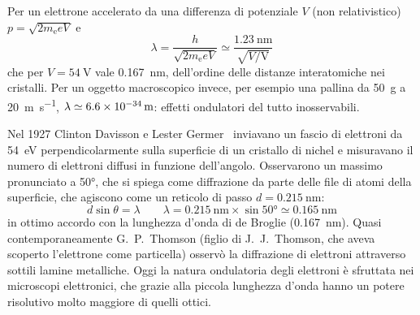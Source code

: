 Per un elettrone accelerato da una differenza di potenziale $V$ (non relativistico) $p=\sqrt{2m_\mathrm{e}eV}$ e
\[
  \lambda=\frac{h}{\sqrt{2m_\mathrm{e}eV}}\simeq\frac{\SI{1.23}{\nano\meter}}{\sqrt{V/\si{\volt}}}
\]
che per $V=\SI{54}{\volt}$ vale \SI{0.167}{\nano\meter}, dell'ordine delle distanze interatomiche nei cristalli. Per un oggetto macroscopico invece, per esempio una pallina da \SI{50}{\gram} a \SI{20}{\meter\per\second}, $\lambda\simeq\SI{6.6E-34}{\meter}$: effetti ondulatori del tutto inosservabili.
\begin{Es}
  Nel 1927 Clinton Davisson e Lester Germer~\cite{davisson1927} inviavano un fascio di elettroni da \SI{54}{\electronvolt} perpendicolarmente sulla superficie di un cristallo di nichel e misuravano il numero di elettroni diffusi in funzione dell'angolo. Osservarono un massimo pronunciato a \ang{50}, che si spiega come diffrazione da parte delle file di atomi della superficie, che agiscono come un reticolo di passo $d=\SI{0.215}{\nano\meter}$:
  \[
    d\sin\theta=\lambda\qquad\lambda=\SI{0.215}{\nano\meter}\times\sin\ang{50}\simeq\SI{0.165}{\nano\meter}
  \]
  in ottimo accordo con la lunghezza d'onda di de Broglie (\SI{0.167}{\nano\meter}). Quasi contemporaneamente G.~P.~Thomson (figlio di J.~J.~Thomson, che aveva scoperto l'elettrone come particella) osservò la diffrazione di elettroni attraverso sottili lamine metalliche. Oggi la natura ondulatoria degli elettroni è sfruttata nei microscopi elettronici, che grazie alla piccola lunghezza d'onda hanno un potere risolutivo molto maggiore di quelli ottici.
\end{Es}

